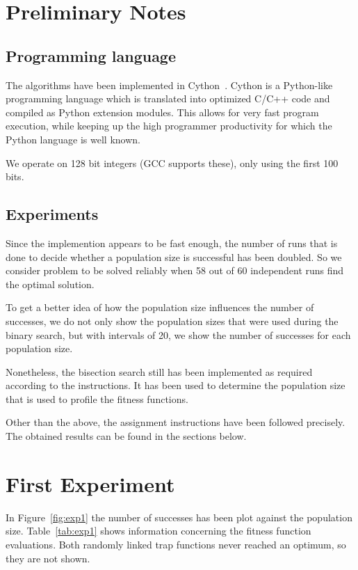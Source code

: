 \documentclass[12pt]{article}
\theoremstyle{definition}
\begin{document}
\maketitle

\section*{Preliminary Notes}

\subsection*{Programming language}
The algorithms have been implemented in Cython~\cite{cython}.
Cython is a Python-like programming language which is translated into optimized
C/C++ code and compiled as Python extension modules.
This allows for very fast program execution, while keeping up the high programmer
productivity for which the Python language is well known.

We operate on 128 bit integers (GCC supports these), only using the first 100 bits.

\subsection*{Experiments}
Since the implemention appears to be fast enough, the number of runs that is done to decide whether a population size is successful has been doubled.
So we consider problem to be solved reliably when 58 out of 60 independent runs find the optimal solution.

To get a better idea of how the population size influences the number of successes, we do not only show the population sizes that were used during the binary search, but with intervals of 20, we show the number of successes for each population size.

Nonetheless, the bisection search still has been implemented as required according to the instructions.
It has been used to determine the population size that is used to profile the fitness functions.

Other than the above, the assignment instructions have been followed precisely.
The obtained results can be found in the sections below.


\section{First Experiment}
\label{ssec:exp1}
In Figure~\ref{fig:exp1} the number of successes has been plot against the population size.
Table~\ref{tab:exp1} shows information concerning the fitness function evaluations.
Both randomly linked trap functions never reached an optimum, so they are not shown.
\end{document}
